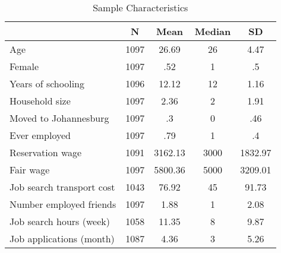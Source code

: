 \begin{table}[htbp]
\caption{\label{clabel} Sample Characteristics \label{tab:sample}}\centering\medskip
\begin{tabular}{lcccc} \hline \hline
 & N  & Mean  & Median  & SD  \\  \hline 
Age & 1097 & 26.69 & 26 & 4.47 \\  
Female & 1097 & .52 & 1 & .5 \\  
Years of schooling & 1096 & 12.12 & 12 & 1.16 \\  
Household size & 1097 & 2.36 & 2 & 1.91 \\  
Moved to Johannesburg & 1097 & .3 & 0 & .46 \\  
Ever employed & 1097 & .79 & 1 & .4 \\  
Reservation wage & 1091 & 3162.13 & 3000 & 1832.97 \\  
Fair wage & 1097 & 5800.36 & 5000 & 3209.01 \\  
Job search transport cost & 1043 & 76.92 & 45 & 91.73 \\  
Number employed friends & 1097 & 1.88 & 1 & 2.08 \\  
Job search hours (week) & 1058 & 11.35 & 8 & 9.87 \\  
Job applications (month) & 1087 & 4.36 & 3 & 5.26 \\  
\hline \hline \end{tabular}
\end{table}
